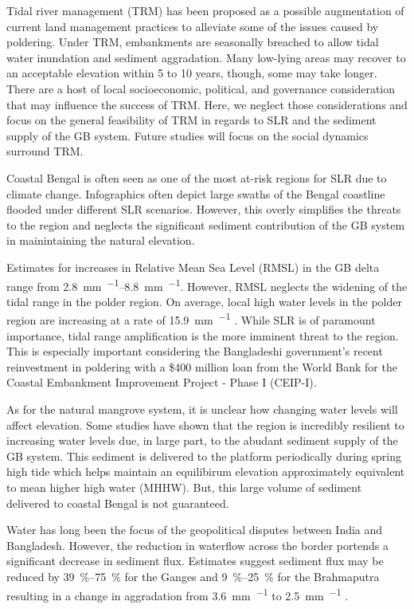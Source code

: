 \documentclass[a4paper,fleqn]{cas-dc}
\begin{document}
Tidal river management (TRM) has been proposed as a possible augmentation of current land management practices to alleviate some of the issues caused by poldering. Under TRM, embankments are seasonally breached to allow tidal water inundation and sediment aggradation. Many low-lying areas may recover to an acceptable elevation within 5 to 10 years, though, some may take longer. There are a host of local socioeconomic, political, and governance consideration that may influence the success of TRM. Here, we neglect those considerations and focus on the general feasibility of TRM in regards to SLR and the sediment supply of the GB system. Future studies will focus on the social dynamics surround TRM.

Coastal Bengal is often seen as one of the most at-risk regions for SLR due to climate change. Infographics often depict large swaths of the Bengal coastline flooded under different SLR scenarios. However, this overly simplifies the threats to the region and neglects the significant sediment contribution of the GB system in mainintaining the natural elevation.

Estimates for increases in Relative Mean Sea Level (RMSL) in the GB delta range from \SIrange{2.8}{8.8}{\milli\meter\per\year}. However, RMSL neglects the widening of the tidal range in the polder region. On average, local high water levels in the polder region are increasing at a rate of \SI{15.9}{\milli\meter\per\year} \citep{pethickRapidRiseEffective2013}. While SLR is of paramount importance, tidal range amplification is the more imminent threat to the region. This is especially important considering the Bangladeshi government's recent reinvestment in poldering with a \$400 million loan from the World Bank for the Coastal Embankment Improvement Project - Phase I (CEIP-I).

As for the natural mangrove system, it is unclear how changing water levels will affect elevation. Some studies have shown that the region is incredibly resilient to increasing water levels due, in large part, to the abudant sediment supply of the GB system. This sediment is delivered to the platform periodically during spring high tide which helps maintain an equilibirum elevation approximately equivalent to mean higher high water (MHHW). But, this large volume of sediment delivered to coastal Bengal is not guaranteed.

Water has long been the focus of the geopolitical disputes between India and Bangladesh. However, the reduction in waterflow across the border portends a significant decrease in sediment flux. Estimates suggest sediment flux may be reduced by \SIrange{39}{75}{\percent} for the Ganges and \SIrange{9}{25}{\percent} for the Brahmaputra resulting in a change in aggradation from \SI{3.6}{\milli\meter\per\year} to \SI{2.5}{\milli\meter\per\year} \citep{higginsRiverLinkingIndia2018}.
\end{document}
